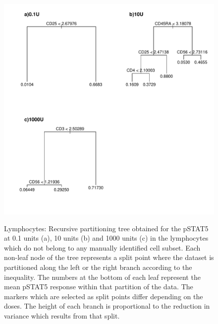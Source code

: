 \begin{figure}[!h]
\centering
\begin{minipage}{.6\textwidth}
\includegraphics[width=\linewidth]{figures/cart-lymphocytes-trees-pstat5}
\end{minipage}
\begin{minipage}{.35\textwidth}
{ Lymphocytes: Recursive partitioning tree obtained for the pSTAT5 at 0.1 units (a), 10 units (b) and 1000 units (c) in the lymphocytes which do not belong to any manually identified cell subset. }
{
  Each non-leaf node of the tree represents a split point where the dataset is partitioned along the left or the right branch
  according to the inequality.
  The numbers at the bottom of each leaf represent the mean pSTAT5 response within that partition of the data.
  The markers which are selected as split points differ depending on the doses.
  The height of each branch is proportional to the reduction in variance which results from that split.
}
\end{minipage}
\end{figure}


